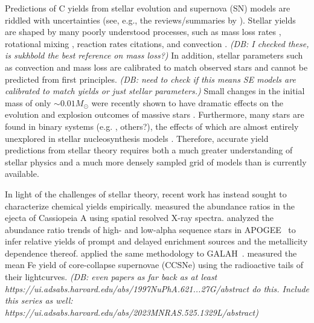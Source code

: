 \documentclass[fleqn,
usenatbib]{mnras}
\newcommand{\dbadd}[1]{{\color{Thistle} #1}}
\newcommand{\dbnote}[1]{ {\color{Thistle} \textit{\small (DB: #1)}} }
\begin{document}
Predictions of C yields from stellar evolution and supernova (SN) models are riddled with uncertainties (see, e.g., the reviews/summaries by \citealt{romano+10, KL14}).
Stellar yields are shaped by many poorly understood processes, such as mass loss rates \citep{sukhbold+16, beasor+2020}, rotational mixing \citep{frischknecht+16, LC18}, reaction rates \dbadd{citations}, and convection \citep{chieffi2001, ventura+13}.
\dbnote{I checked these, is sukhbold the best reference on mass loss?}
\dbadd{In addition, stellar parameters such as convection and mass loss are calibrated to match observed stars and cannot be predicted from first principles.} \dbnote{need to check if this means SE models are calibrated to match yields or just stellar parameters.}
Small changes in the initial mass of only $\sim$$0.01 M_\odot$  were recently shown to have dramatic effects on the evolution and explosion outcomes of massive stars \citep{bruenn+2023, vartanyan_burrows2023}.
Furthermore, many stars are found in binary systems \dbadd{(e.g. \citealt{MKB2019}, others?)}, the effects of which are almost entirely unexplored in stellar nucleosynthesis models \citet{farmer+21}.
Therefore, accurate yield predictions from stellar theory requires both a much greater understanding of stellar physics and a much more densely sampled grid of models than is currently available.


In light of the challenges of stellar theory, recent work has instead sought to characterize chemical yields empirically.
\citet{HLA20} measured the abundance ratios in the ejecta of Cassiopeia A using spatial resolved X-ray spectra.
\citet{weinberg+19, weinberg+22} analyzed the abundance ratio trends of high- and low-alpha sequence stars in APOGEE~\citep{apogee17} to infer relative yields of prompt and delayed enrichment sources and the metallicity dependence thereof.
\citet{emily+19, emily+22, emily+24} applied the same methodology to GALAH~\citep{DeSilva2015, Martell2017}.
\citet{rodriguez+21, rodriguez+23} measured the mean Fe yield of core-collapse supernovae (CCSNe) using the radioactive tails of their lightcurves.
\dbnote{even papers as far back as at least https://ui.adsabs.harvard.edu/abs/1997NuPhA.621...27G/abstract do this. Include this series as well: https://ui.adsabs.harvard.edu/abs/2023MNRAS.525.1329L/abstract}
\end{document}
